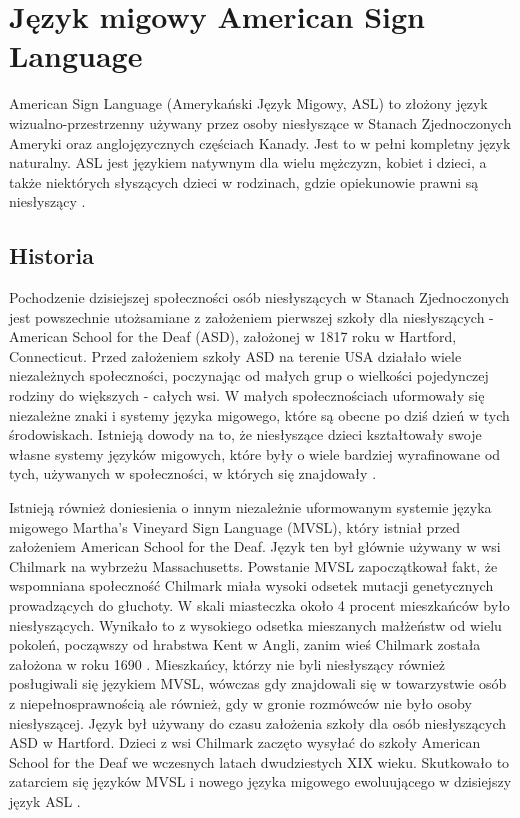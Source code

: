 \documentclass[a4paper,12pt,oneside]{book} %
\begin{document}
\chapter{Język migowy American Sign Language}
American Sign Language (Amerykański Język Migowy, ASL) to złożony język wizualno-przestrzenny używany przez osoby niesłyszące w Stanach Zjednoczonych Ameryki oraz anglojęzycznych częściach Kanady. Jest to w pełni kompletny język naturalny. ASL jest językiem natywnym dla wielu mężczyzn, kobiet i dzieci, a także niektórych słyszących dzieci w rodzinach, gdzie opiekunowie prawni są niesłyszący \cite{nakamura}.
\section{Historia}
Pochodzenie dzisiejszej społeczności osób niesłyszących w Stanach Zjednoczonych jest powszechnie utożsamiane z założeniem pierwszej szkoły dla niesłyszących - American School for the Deaf (ASD), założonej w 1817 roku w Hartford, Connecticut. Przed założeniem szkoły ASD na terenie USA działało wiele niezależnych społeczności, poczynając od małych grup o wielkości pojedynczej rodziny do większych - całych wsi. W małych społecznościach uformowały się niezależne znaki i systemy języka migowego, które są obecne po dziś dzień w tych środowiskach. Istnieją dowody na to, że niesłyszące dzieci kształtowały swoje własne systemy języków migowych, które były o wiele bardziej wyrafinowane od tych, używanych w społeczności, w których się znajdowały \cite{bahan}.

Istnieją również doniesienia o innym niezależnie uformowanym systemie języka migowego Martha’s Vineyard Sign Language (MVSL), który istniał przed założeniem American School for the Deaf. Język ten był głównie używany w wsi Chilmark na wybrzeżu Massachusetts. Powstanie MVSL zapoczątkował fakt, że wspomniana społeczność Chilmark miała wysoki odsetek mutacji genetycznych prowadzących do głuchoty. W skali miasteczka około 4 procent mieszkańców było niesłyszących. Wynikało to z wysokiego odsetka mieszanych małżeństw od wielu pokoleń, począwszy od hrabstwa Kent w Angli, zanim wieś Chilmark została założona w roku 1690 \cite{groce}. Mieszkańcy, którzy nie byli niesłyszący również posługiwali się językiem MVSL, wówczas gdy znajdowali się w towarzystwie osób z niepełnosprawnością ale również, gdy w gronie rozmówców nie było osoby niesłyszącej. Język był używany do czasu założenia szkoły dla osób niesłyszących ASD w Hartford. Dzieci z wsi Chilmark zaczęto wysyłać do szkoły American School for the Deaf we wczesnych latach dwudziestych XIX wieku. Skutkowało to zatarciem się języków MVSL i nowego języka migowego ewoluującego w dzisiejszy język ASL \cite{bahan}.
\end{document}
